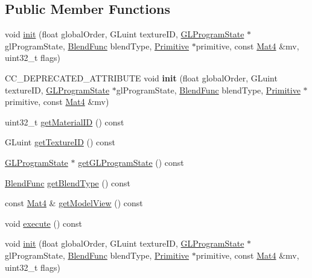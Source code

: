 \subsection*{Public Member Functions}
\begin{DoxyCompactItemize}
\item 
void \hyperlink{classPrimitiveCommand_a721c36fa82c2d44c339d22363b633a6d}{init} (float global\+Order, G\+Luint texture\+ID, \hyperlink{classGLProgramState}{G\+L\+Program\+State} $\ast$gl\+Program\+State, \hyperlink{structBlendFunc}{Blend\+Func} blend\+Type, \hyperlink{classPrimitive}{Primitive} $\ast$primitive, const \hyperlink{classMat4}{Mat4} \&mv, uint32\+\_\+t flags)
\item 
\mbox{\label{classPrimitiveCommand_aaf32bfaaeb3c3d724460be0190cb9d7d}} 
C\+C\+\_\+\+D\+E\+P\+R\+E\+C\+A\+T\+E\+D\+\_\+\+A\+T\+T\+R\+I\+B\+U\+TE void {\bfseries init} (float global\+Order, G\+Luint texture\+ID, \hyperlink{classGLProgramState}{G\+L\+Program\+State} $\ast$gl\+Program\+State, \hyperlink{structBlendFunc}{Blend\+Func} blend\+Type, \hyperlink{classPrimitive}{Primitive} $\ast$primitive, const \hyperlink{classMat4}{Mat4} \&mv)
\item 
uint32\+\_\+t \hyperlink{classPrimitiveCommand_a524b9922884e50c3512a5064ecf1514d}{get\+Material\+ID} () const
\item 
G\+Luint \hyperlink{classPrimitiveCommand_a151c18f3e3969178df27e862dda4a7ad}{get\+Texture\+ID} () const
\item 
\hyperlink{classGLProgramState}{G\+L\+Program\+State} $\ast$ \hyperlink{classPrimitiveCommand_a0045e39f2f8fa3cab081bacc6ddac422}{get\+G\+L\+Program\+State} () const
\item 
\hyperlink{structBlendFunc}{Blend\+Func} \hyperlink{classPrimitiveCommand_a132bf1c144f322b06dce2db6924ebab3}{get\+Blend\+Type} () const
\item 
const \hyperlink{classMat4}{Mat4} \& \hyperlink{classPrimitiveCommand_a3625a2289ce8069914ce790b7ac7d29a}{get\+Model\+View} () const
\item 
void \hyperlink{classPrimitiveCommand_aeac9906f9e9ea410c5cc701c17be80fd}{execute} () const
\item 
void \hyperlink{classPrimitiveCommand_a721c36fa82c2d44c339d22363b633a6d}{init} (float global\+Order, G\+Luint texture\+ID, \hyperlink{classGLProgramState}{G\+L\+Program\+State} $\ast$gl\+Program\+State, \hyperlink{structBlendFunc}{Blend\+Func} blend\+Type, \hyperlink{classPrimitive}{Primitive} $\ast$primitive, const \hyperlink{classMat4}{Mat4} \&mv, uint32\+\_\+t flags)

\end{DoxyCompactItemize}
